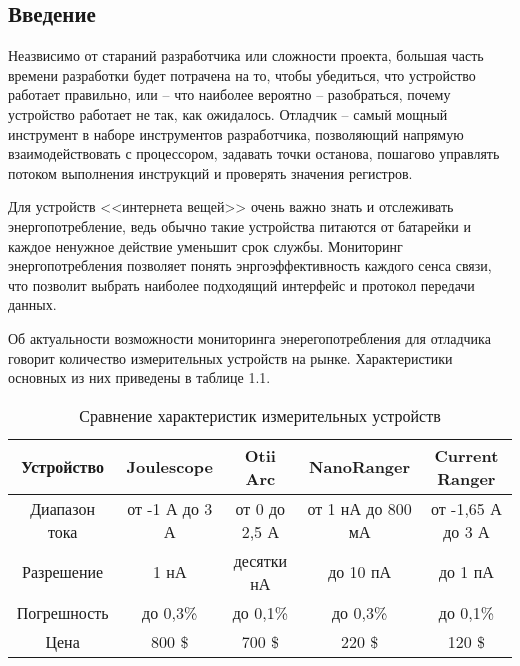 \begin{input}
\chapter{Введение}
\hspace{1cm} Неазвисимо от стараний разработчика или сложности проекта, большая часть времени разработки
будет потрачена на то, чтобы убедиться, что устройство работает правильно, или -- что наиболее
вероятно -- разобраться, почему устройство работает не так, как ожидалось. Отладчик -- самый мощный 
инструмент в наборе инструментов разработчика, позволяющий напрямую взаимодействовать с процессором,
задавать точки останова, пошагово управлять потоком выполнения инструкций и проверять  значения
регистров. \cite{Lakamera:embed}

Для устройств <<интернета вещей>> очень важно знать и отслеживать энергопотребление,
ведь обычно такие устройства питаются от батарейки и каждое ненужное действие уменьшит
срок службы. Мониторинг энергопотребления позволяет понять энргоэффективность каждого сенса связи,
что позволит выбрать наиболее подходящий интерфейс и протокол передачи данных.

Об актуальности возможности мониторинга энерегопотребления для отладчика говорит количество 
измерительных устройств на рынке. Характеристики основных из них приведены в таблице 1.1.

\begin{table}[H]
    \caption{Сравнение характеристик измерительных устройств}   
    \begin{center}
    \begin{tabular}{|c|c|c|c|c|}
    \hline
  Устройство & Joulescope & Otii Arc & NanoRanger & Current Ranger \\ \hline
    Диапазон тока & от -1 А до 3 А & от 0 до 2,5 А & от 1 нА до 800 мА & от -1,65 А до 3 А \\ \hline
    Разрешение & 1 нА & десятки нА & до 10 пА & до 1 пА  \\ \hline
    Погрешность & до 0,3\% & до 0,1\% & до 0,3\% & до 0,1\% \\ \hline
    Цена & 800 \$ & 700 \$ & 220 \$ & 120 \$  \\ \hline
    \end{tabular}
    \end{center}
\end{table} 


\end{input}
